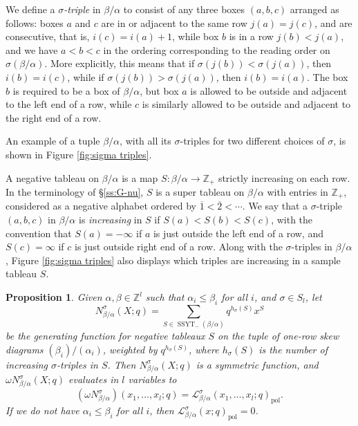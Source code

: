 \documentclass[12pt]{amsart}
\newtheorem{prop}[thm]{Proposition}
\theoremstyle{definition}
\theoremstyle{remark}
\newcommand{\ZZ}{{\mathbb Z}}
\newcommand{\Lcal}{{\mathcal L}}
\DeclareMathOperator{\pol}{pol}
\DeclareMathOperator{\SSYT}{SSYT}
\begin{document}
We define a {\em $\sigma $-triple} in $\beta /\alpha $ to consist of
any three boxes $(a,b,c)$ arranged as follows: boxes $a$ and $c$ are
in or adjacent to the same row $j(a) = j(c)$, and are consecutive,
that is, $i(c) = i(a)+1$, while box $b$ is in a row $j(b)<j(a)$, and
we have $a<b<c$ in the ordering corresponding to the reading order on
$\sigma (\beta /\alpha )$.  More explicitly, this means that if
$\sigma (j(b))<\sigma (j(a))$, then $i(b) = i(c)$, while if $\sigma
(j(b))>\sigma (j(a))$, then $i(b) = i(a)$.  The box $b$ is required to
be a box of $\beta /\alpha $, but box $a$ is allowed to be outside and
adjacent to the left end of a row, while $c$ is similarly allowed to
be outside and adjacent to the right end of a row.

An example of a tuple $\beta /\alpha $, with all its $\sigma $-triples
for two different choices of $\sigma $, is shown in Figure
\ref{fig:sigma triples}.

A negative tableau on $\beta /\alpha $ is a map $S\colon \beta /\alpha
\rightarrow \ZZ _{+}$ strictly increasing on each row.  In the
terminology of \S \ref{ss:G-nu}, $S$ is a super tableau on $\beta
/\alpha $ with entries in $\ZZ _{+}$, considered as a negative
alphabet ordered by $\overline{1}<\overline{2}<\cdots $.  We say that
a $\sigma $-triple $(a,b,c)$ in $\beta /\alpha $ is {\em increasing}
in $S$ if $S(a)<S(b)<S(c)$, with the convention that $S(a) = -\infty $
if $a$ is just outside the left end of a row, and $S(c) = \infty $ if
$c$ is just outside right end of a row.  Along with the $\sigma
$-triples in $\beta /\alpha $, Figure \ref{fig:sigma triples} also
displays which triples are increasing in a sample tableau $S$.

\begin{prop}\label{prop:e-mu-coef}
Given $\alpha ,\beta \in \ZZ ^{l}$ such that $\alpha _{i}\leq \beta
_{i}$ for all $i$, and $\sigma \in S_{l}$, let
\begin{equation}\label{e:triples-N}
N^{\sigma }_{\beta /\alpha }(X;q) = 
\sum_{S\in\SSYT_{-}(\beta/\alpha)} q^{h_\sigma(S)} x^S
\end{equation}
be the generating function for negative tableaux $S$ on the tuple of
one-row skew diagrams $(\beta _{i})/(\alpha _{i})$, weighted by
$q^{h_{\sigma }(S)}$, where $h_{\sigma }(S)$ is the number of
increasing $\sigma $-triples in $S$.  Then $N^{\sigma }_{\beta /\alpha
}(X;q)$ is a symmetric function, and $\omega N^{\sigma }_{\beta
/\alpha }(X;q)$ evaluates in $l$ variables to
\begin{equation}\label{e:N-vs-Lcal}
(\omega N^{\sigma }_{\beta /\alpha })(x_{1},\ldots,x_{l};q) = \Lcal ^{\sigma
}_{\beta /\alpha }(x_{1},\ldots,x_{l};q)_{\pol }.
\end{equation}
If we do not have $\alpha _{i}\leq \beta _{i}$ for all $i$, then
$\Lcal ^{\sigma }_{\beta /\alpha }(x;q)_{\pol } = 0$.
\end{prop}
\end{document}
